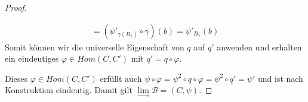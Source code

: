 \documentclass[10pt,a4paper]{report}
\newcommand{\colimes}[0]{\lim\limits_{ \longrightarrow }}
\begin{document}
\begin{proof}
\begin{itemize}
\begin{gather*}
= (\psi'_{\gamma(B_{\gamma})} \circ \gamma)(b)
= \psi'_{B_{\gamma}}(b)
\end{gather*}
Somit können wir die universelle Eigenschaft von $q$ auf $q'$ anwenden und erhalten ein eindeutiges $\varphi \in Hom(C,C')$ mit $q' = q \circ \varphi$.
\begin{center}
\end{center}
\end{itemize}
Dieses $\varphi \in Hom(C,C')$ erfüllt auch $\psi \circ \varphi = \psi^2 \circ q \circ \varphi = \psi^2 \circ q' = \psi'$ und ist nach Konstruktion eindeutig. Damit gilt $\colimes \mathcal{B} = (C,\psi)$.
\end{proof}
\end{document}
